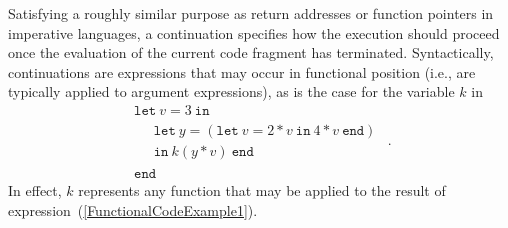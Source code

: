 Satisfying a roughly similar purpose as return addresses or function
pointers in imperative languages, a continuation specifies how the
execution should proceed once the evaluation of the current code
fragment has terminated. Syntactically, continuations are expressions
that may occur in functional position (i.e., are typically applied to
argument expressions), as is the case for the variable $k$ in
\begin{equation}
\label{ContinuationCode0}
\begin{array}{l}
  \mathtt{let}\ v = 3\ \mathtt{in}\\
  \quad \begin{array}{l} 
    \mathtt{let}\ y = (\mathtt{let}\ v=2*v \ \mathtt{in}\ 4*v\ \mathtt{end})\\
    \mathtt{in}\ k (y*v)\ \mathtt{end}
  \end{array}\\
  \mathtt{end}
  \end{array}.
\end{equation}
In effect, $k$ represents any function that may be applied to the
result of expression~(\ref{FunctionalCodeExample1}).

